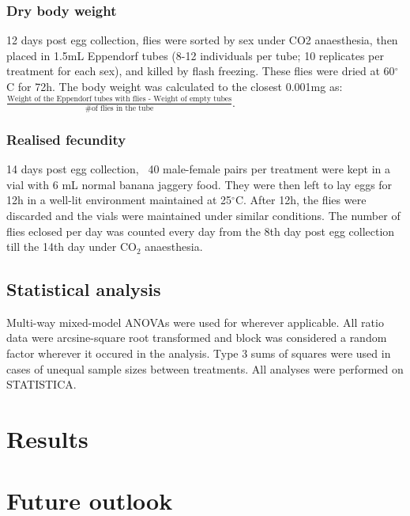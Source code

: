 \documentclass[12pt,onecolumn,twoside]{article}
\begin{document}
	\subsubsection{Dry body weight}
	12 days post egg collection, flies were sorted by sex under CO2 anaesthesia, then placed in 1.5mL Eppendorf tubes (8-12 individuals per tube; 10 replicates per treatment for each sex), and killed by flash freezing. These flies were dried at 60$^{\circ}$C for 72h. The body weight was calculated to the closest 0.001mg as: $\frac{\text{Weight of the Eppendorf tubes with flies - Weight of empty tubes}}{\text{\# of flies in the tube}}$.
	\subsubsection{Realised fecundity}
	14 days post egg collection, ~40 male-female pairs per treatment were kept in a vial with 6 mL normal banana jaggery food. They were then left to lay eggs for 12h in a well-lit environment maintained at 25$^{\circ}$C. After 12h, the flies were discarded and the vials were maintained under similar conditions. The number of flies eclosed per day was counted every day from the 8th day post egg collection till the 14th day under $\text{CO}_{2}$ anaesthesia.

	\subsection{Statistical analysis}
	Multi-way mixed-model ANOVAs were used for wherever applicable. All ratio data were arcsine-square root transformed and block was considered a random factor wherever it occured in the analysis. Type 3 sums of squares were used in cases of unequal sample sizes between treatments. All analyses were performed on STATISTICA.
	\section{Results}
	\section{Future outlook}

	
	
\end{document}

